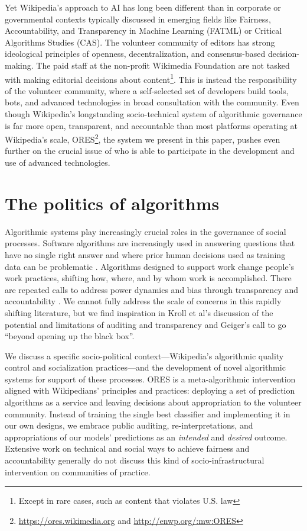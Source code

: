 \documentclass{sigchi-ext}
\begin{document}
Yet Wikipedia's approach to AI has long been different than in corporate or governmental contexts typically discussed in emerging fields like Fairness, Accountability, and Transparency in Machine Learning (FATML) or Critical Algorithms Studies (CAS). The volunteer community of editors has strong ideological principles of openness, decentralization, and consensus-based decision-making. The paid staff at the non-profit Wikimedia Foundation are not tasked with making editorial decisions about content\footnote{Except in rare cases, such as content that violates U.S. law}. This is instead the responsibility of the volunteer community, where a self-selected set of developers build tools, bots, and advanced technologies in broad consultation with the community. Even though Wikipedia's longstanding socio-technical system of algorithmic governance is far more open, transparent, and accountable than most platforms operating at Wikipedia's scale, ORES\footnote{\url{https://ores.wikimedia.org} and \url{http://enwp.org/:mw:ORES}}, the system we present in this paper, pushes even further on the crucial issue of who is able to participate in the development and use of advanced technologies.

\section{The politics of algorithms}
Algorithmic systems play increasingly crucial roles in the governance of social processes\cite{gillespie2014relevance}. Software algorithms are increasingly used in answering questions that have no single right answer and where prior human decisions used as training data can be problematic \cite{barocas2013governing}. Algorithms designed to support work change people's work practices, shifting how, where, and by whom work is accomplished\cite{crawford2016algorithm, zuboff1988age}. There are repeated calls to address power dynamics and bias through transparency and accountability \cite{diakopoulos2017algorithmic,sandvig2014auditing}. We cannot fully address the scale of concerns in this rapidly shifting literature, but we find inspiration in Kroll et al's discussion of the potential and limitations of auditing and transparency \cite{kroll2016accountable} and Geiger's call to go ``beyond opening up the black box\cite{geiger2017beyond}''.

We discuss a specific socio-political context---Wikipedia's algorithmic quality control and socialization practices---and the development of novel algorithmic systems for support of these processes.  ORES is a meta-algorithmic intervention aligned with Wikipedians' principles and practices: deploying a set of prediction algorithms as a service and leaving decisions about appropriation to the volunteer community.  Instead of training the single best classifier and implementing it in our own designs, we embrace public auditing, re-interpretations, and appropriations of our models' predictions as an \emph{intended} and \emph{desired} outcome.  Extensive work on technical and social ways to achieve fairness and accountability generally do not discuss this kind of socio-infrastructural intervention on communities of practice.
\end{document}
